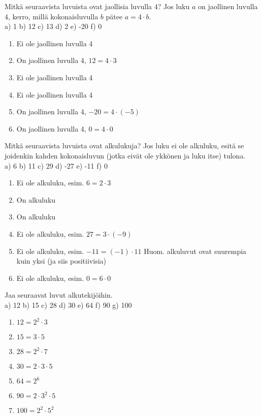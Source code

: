 \begin{tehtava}
Mitkä seuraavista luvuista ovat jaollisia luvulla $4$? Jos luku $a$ on jaollinen luvulla $4$, kerro, millä kokonaisluvulla $b$ pätee $a = 4 \cdot b$.\\
a) 1 \quad b) 12  \quad c) 13 \quad d) 2 \quad e) -20 \quad f) 0

\begin{vastaus}
\begin{enumerate}
	\item Ei ole jaollinen luvulla 4
	\item On jaollinen luvulla 4, $12 = 4 \cdot 3$
	\item Ei ole jaollinen luvulla 4
	\item Ei ole jaollinen luvulla 4
	\item On jaollinen luvulla 4, $-20 = 4 \cdot (-5)$
	\item On jaollinen luvulla 4, $0 = 4 \cdot 0$
\end{enumerate}
\end{vastaus}
\end{tehtava}

\begin{tehtava}
Mitkä seuraavista luvuista ovat alkulukuja? Jos luku ei ole alkuluku, esitä se joidenkin kahden kokonaisluvun (jotka eivät ole ykkönen ja luku itse) tulona.\\
a) 6 \quad b) 11 \quad c) 29 \quad d) -27 \quad e) -11 \quad f) 0

\begin{vastaus}
\begin{enumerate}
	\item Ei ole alkuluku, esim. $6 = 2 \cdot 3$
	\item On alkuluku
	\item On alkuluku
	\item Ei ole alkuluku, esim. $27 = 3 \cdot (-9)$
	\item Ei ole alkuluku, esim. $-11 = (-1) \cdot 11$ Huom. alkuluvut ovat suurempia kuin yksi (ja siis positiivisia)
	\item Ei ole alkuluku, esim. $0 = 6 \cdot 0$
\end{enumerate}
\end{vastaus}
\end{tehtava}

\begin{tehtava}
Jaa seuraavat luvut alkutekijöihin.\\
a) 12 \quad b) 15 \quad c) 28 \quad d) 30 \quad e) 64 \quad f) 90 \quad g) 100

\begin{vastaus}
\begin{enumerate}
	\item $12 = 2^2 \cdot 3$
	\item $15 = 3 \cdot 5$
	\item $28 = 2^2 \cdot 7$
	\item $30 = 2 \cdot 3 \cdot 5$
	\item $64 = 2^6$
	\item $90 = 2 \cdot 3^2 \cdot 5$
	\item $100 = 2^2 \cdot 5^2$
\end{enumerate}
\end{vastaus}
\end{tehtava}